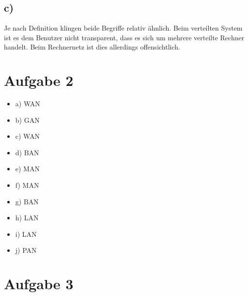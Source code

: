 \documentclass[a4paper,12pt]{scrartcl}
\begin{document}
\subsection{c)}
Je nach Definition klingen beide Begriffe relativ ähnlich. Beim verteilten
System ist es dem Benutzer nicht transparent, dass es sich um mehrere verteilte
Rechner handelt. Beim Rechnernetz ist dies allerdings offensichtlich.

\section{Aufgabe 2}
\begin{itemize}
	\item a) WAN
	\item b) GAN
	\item c) WAN
	\item d) BAN
	\item e) MAN
	\item f) MAN
	\item g) BAN
	\item h) LAN
	\item i) LAN
	\item j) PAN
\end{itemize}

\section{Aufgabe 3}
\end{document}
